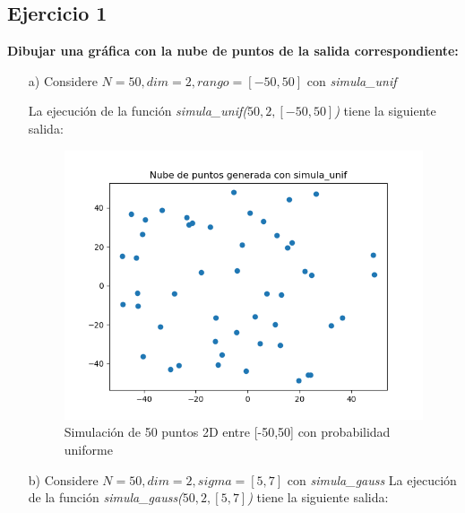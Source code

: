 \subsection{Ejercicio 1}

\textbf{Dibujar una gráfica con la nube de puntos de la salida correspondiente:}

\begin{itemize}
	\item[a)] Considere $N=50, dim=2, rango=[-50,50]$ con \textit{simula\_unif}
	
	La ejecución de la función \textit{simula\_unif($50,2,[-50,50]$)} tiene la siguiente salida:
	
	\begin{figure}[H] %
		\centering
		\includegraphics[scale=0.5]{simula_unif1.png}  %
		\caption{Simulación de 50 puntos 2D entre [-50,50] con probabilidad uniforme} 
		\label{fig:simula-unif}
	\end{figure}
	
	\item[b)] Considere $N=50, dim=2, sigma=[5,7]$ con \textit{simula\_gauss}
	La ejecución de la función \textit{simula\_gauss($50,2,[5,7]$)} tiene la siguiente salida:
	

\end{itemize}
